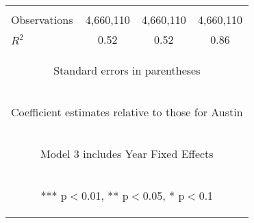 \begin{center}
\begin{tabular}{lccc}
\vspace{4pt} & \begin{footnotesize}\end{footnotesize} & \begin{footnotesize}\end{footnotesize} & \begin{footnotesize}\end{footnotesize} \\
Observations & 4,660,110 & 4,660,110 & 4,660,110 \\
 $R^2$ & 0.52 & 0.52 & 0.86 \\ \hline
\multicolumn{4}{c}{\begin{footnotesize} Standard errors in parentheses\end{footnotesize}} \\
\multicolumn{4}{c}{\begin{footnotesize} Coefficient estimates relative to those for Austin\end{footnotesize}} \\
\multicolumn{4}{c}{\begin{footnotesize} Model 3 includes Year Fixed Effects\end{footnotesize}} \\
\multicolumn{4}{c}{\begin{footnotesize} *** p$<$0.01, ** p$<$0.05, * p$<$0.1\end{footnotesize}} \\
\end{tabular}
\end{center}
